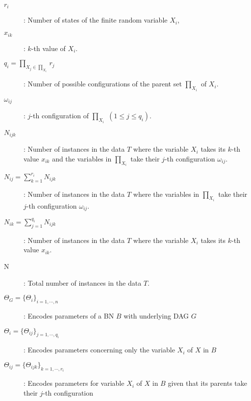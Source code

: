 \begin{description}

	\item[$r_{i}$]: Number of states of the finite random variable $X_{i}$,
	
	\item[$x_{ik}$]: $k$-th value of $X_{i}$.
	
	\item[$q_{i}=\prod_{X_{j}\in\prod_{X_{i}}}r_{j}$]: Number of possible configurations of the parent set $\prod_{X_{i}}$ of $X_{i}$.
	
	\item[$\omega_{ij}$]: $j$-th configuration of $\prod_{X_{i}}$ $(1 \leq j \leq q_{i})$.
	
	\item[$N_{ijk}$]: Number of instances in the data $T$ where the variable $X_{i}$ takes its $k$-th value $x_{ik}$ and the variables in $\prod_{X_{i}}$ take their $j$-th configuration $\omega_{ij}$.
	
	\item[$N_{ij}=\sum_{k=1}^{r_{i}}N_{ijk}$]: Number of instances in the data $T$ where the variables in $\prod_{X_{i}}$ take their $j$-th configuration $\omega_{ij}$.
	
	\item[$N_{ik}=\sum_{j=1}^{q_{i}}N_{ijk}$]: Number of instances in the data $T$ where the variable $X_{i}$ takes its $k$-th value $x_{ik}$.
	
	\item[N]: Total number of instances in the data $T$.
	
	\item[$\Theta_{G}=\{\Theta_{i}\}_{i=1,\cdots,n}$]: Encodes parameters of a BN \textbf{$B$} with underlying DAG $G$
	
	\item[$\Theta_{i}=\{\Theta_{ij}\}_{j=1,\cdots,q_{i}}$]: Encodes parameters concerning only the variable $X_{i}$ of $X$ in $B$

	\item[$\Theta_{ij}=\{\Theta_{ijk}\}_{k=1,\cdots,r_{i}}$]: Encodes parameters for variable $X_{i}$ of $X$ in $B$ given that its parents take their $j$-th configuration

\end{description}
